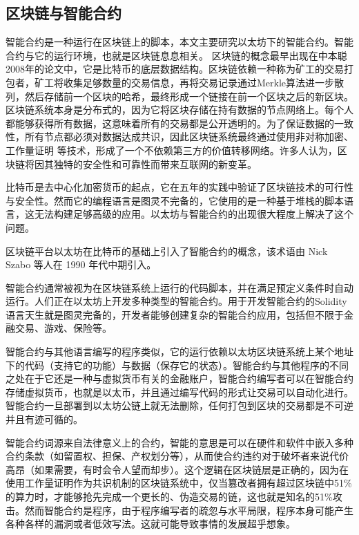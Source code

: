 \subsection{区块链与智能合约}

智能合约是一种运行在区块链上的脚本，本文主要研究以太坊下的智能合约。智能合约与它的运行环境，也就是区块链息息相关。
区块链的概念最早出现在中本聪 2008年的论文\cite{ASE69}中，它是比特币的底层数据结构。区块链依赖一种称为矿工的交易打包者，矿工将收集足够数量的交易信息，再将交易记录通过Merkle算法进一步散列，然后存储前一个区块的哈希，最终形成一个链接在前一个区块之后的新区块。区块链系统本身是分布式的，因为它将区块存储在持有数据的节点网络上。每个人都能够获得所有数据，这意味着所有的交易都是公开透明的。为了保证数据的一致性，所有节点都必须对数据达成共识，因此区块链系统最终通过使用非对称加密、工作量证明\cite{ASE69} 等技术，形成了一个不依赖第三方的价值转移网络。许多人认为，区块链将因其独特的安全性和可靠性\cite{ ASE83}而带来互联网的新变革。

比特币是去中心化加密货币的起点，它在五年的实践中验证了区块链技术的可行性与安全性。然而它的编程语言是图灵不完备的，它使用的是一种基于堆栈的脚本语言，这无法构建足够高级的应用。以太坊与智能合约的出现很大程度上解决了这个问题。

区块链平台以太坊在比特币的基础上引入了智能合约的概念，该术语由 Nick Szabo 等人\cite{smart_contract}在 1990 年代中期引入。

智能合约通常被视为在区块链系统上运行的代码脚本，并在满足预定义条件时自动运行。人们正在以太坊上开发多种类型的智能合约。用于开发智能合约的Solidity语言天生就是图灵完备的\cite{ASE84}，开发者能够创建复杂的智能合约应用，包括但不限于金融交易、游戏、保险等。

智能合约与其他语言编写的程序类似，它的运行依赖以太坊区块链系统上某个地址下的代码（支持它的功能）与数据（保存它的状态）。智能合约与其他程序的不同之处在于它还是一种与虚拟货币有关的金融账户，智能合约编写者可以在智能合约存储虚拟货币，也就是以太币，并且通过编写代码的形式让交易可以自动化进行。智能合约一旦部署到以太坊公链上就无法删除，任何打包到区块的交易都是不可逆并且有迹可循的。

智能合约词源来自法律意义上的合约，智能的意思是可以在硬件和软件中嵌入多种合约条款（如留置权、担保、产权划分等），从而使合约违约对于破坏者来说代价高昂（如果需要，有时会令人望而却步）。这个逻辑在区块链层是正确的，因为在使用工作量证明作为共识机制的区块链系统中，仅当篡改者拥有超过区块链中51\%的算力时，才能够抢先完成一个更长的、伪造交易的链，这也就是知名的51\%攻击。然而智能合约是程序，由于程序编写者的疏忽与水平局限，程序本身可能产生各种各样的漏洞或者低效写法。这就可能导致事情的发展超乎想象。

